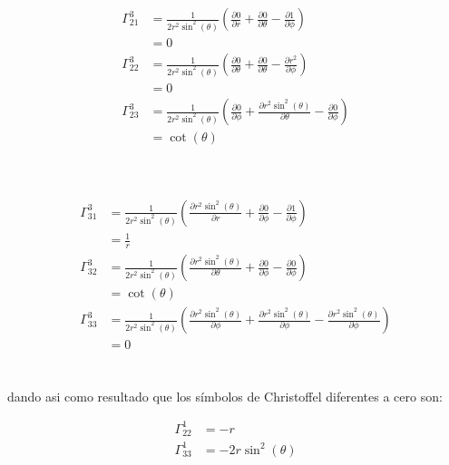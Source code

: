 \documentclass[12pt,letterpaper]{report}
\begin{document}
\hspace{0.25cm}
\begin{minipage}{0.3\linewidth}
    \begin{align*}
        \Gamma^{3}_{21} &= \frac{1}{2r^2\sin^2(\theta)} \left(\frac{\partial 0}{\partial r}+ \frac{\partial 0}{\partial \theta} - \frac{\partial 1}{\partial \phi}\right)\\
&=0\\
\Gamma^{3}_{22} &= \frac{1}{2r^2\sin^2(\theta)} \left(\frac{\partial 0}{\partial \theta}+\frac{\partial 0}{\partial \theta}-\frac{\partial r^2}{\partial \phi} \right)\\
&=0\\
\Gamma^{3}_{23} &= \frac{1}{2r^2\sin^2(\theta)} \left(\frac{\partial 0}{\partial \phi}+\frac{\partial r^2\sin^2(\theta)}{\partial \theta}-\frac{\partial 0}{\partial \phi} \right)\\
&=\cot(\theta)\\
    \end{align*}
\end{minipage}\\
\begin{minipage}{0.3\linewidth}
    \begin{align*}
        \Gamma^{3}_{31} &= \frac{1}{2r^2\sin^2(\theta)} \left(\frac{\partial r^2\sin^2(\theta)}{\partial r}+ \frac{\partial 0}{\partial \phi} - \frac{\partial 1}{\partial \phi}\right)\\
        &=\frac{1}{r}\\
        \Gamma^{3}_{32} &= \frac{1}{2r^2\sin^2(\theta)} \left(\frac{\partial r^2\sin^2(\theta)}{\partial \theta}+\frac{\partial 0}{\partial \phi}-\frac{\partial 0}{\partial \phi} \right)\\
        &=\cot(\theta)\\
        \Gamma^{3}_{33} &= \frac{1}{2r^2\sin^2(\theta)} \left(\frac{\partial r^2\sin^2(\theta)}{\partial \phi}+\frac{\partial r^2\sin^2(\theta)}{\partial \phi}-\frac{\partial r^2\sin^2(\theta)}{\partial \phi} \right)\\
        &=0\\  
    \end{align*}
\end{minipage}\\
dando asi como resultado que los símbolos de Christoffel diferentes a cero son:
\begin{minipage}{0.3\linewidth}
    \begin{align*}
        \Gamma^{1}_{22} &= -r \\
        \Gamma^1_{33} &= -2r\sin^2(\theta)
    \end{align*}
\end{minipage}
\end{document}
